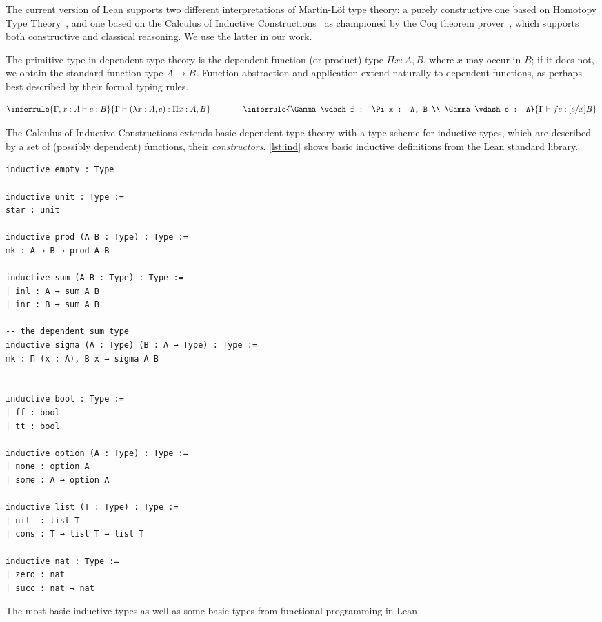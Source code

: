 The current version of Lean supports two different interpretations of Martin-Löf type theory:
a purely constructive one based on Homotopy Type Theory~\cite{hottbook}, and one based on the
Calculus of Inductive
Constructions~\cite{coquand1988calculus,pfenning1989inductively} as championed
by the Coq theorem prover~\cite{Coq:manual}, which supports both constructive
and classical reasoning. We use the latter in our work.

The primitive type in dependent type theory is the dependent function (or
product) type $\Pi x : A, B$, where $x$ may occur in $B$; if it does not, we
obtain the standard function type $A \rightarrow B$. Function abstraction and
application extend naturally to dependent functions, as perhaps best described
by their formal typing rules.

\[
  \inferrule
    {\Gamma, x : A \vdash e : B}
    {\Gamma \vdash (\lambda x : A, e) : \Pi x : A, B}
  \hspace{4em}
  \inferrule
    {\Gamma \vdash f : \Pi x : A, B \\ \Gamma \vdash e : A}
    {\Gamma \vdash f e : [e/x]B}
\]

The Calculus of Inductive Constructions extends basic dependent type theory with
a type scheme for inductive types, which are described by a set of (possibly
dependent) functions, their \emph{constructors}. \autoref{lst:ind} shows basic
inductive definitions from the Lean standard library.

\begin{listing}[btp]
  \begin{verbatim}
inductive empty : Type

inductive unit : Type :=
star : unit

inductive prod (A B : Type) : Type :=
mk : A → B → prod A B

inductive sum (A B : Type) : Type :=
| inl : A → sum A B
| inr : B → sum A B

-- the dependent sum type
inductive sigma (A : Type) (B : A → Type) : Type :=
mk : Π (x : A), B x → sigma A B


inductive bool : Type :=
| ff : bool
| tt : bool

inductive option (A : Type) : Type :=
| none : option A
| some : A → option A

inductive list (T : Type) : Type :=
| nil  : list T
| cons : T → list T → list T

inductive nat : Type :=
| zero : nat
| succ : nat → nat
  \end{verbatim}

  \caption{The most basic inductive types as well as some basic types from
    functional programming in Lean}
  \label{lst:ind}
\end{listing}

